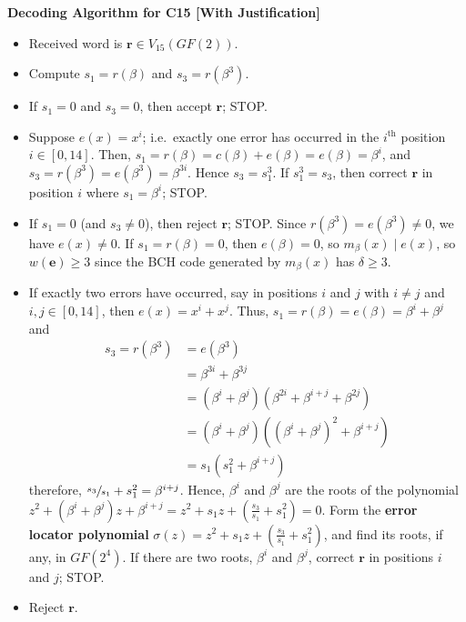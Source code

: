 \begin{algbox}
    \textbf{Decoding Algorithm for C15 [With Justification]}
    \begin{itemize}
        \item Received word is $ \bm{r}\in V_{15}(GF(2)) $.
        \item Compute $ s_1=r(\beta) $ and $ s_3=r(\beta^3) $.
        \item If $ s_1=0 $ and $ s_3=0 $, then accept $ \bm{r} $; STOP\@.
        \item Suppose $ e(x)=x^i $; i.e.\ exactly one error has occurred in the $ i^{\text{th}} $
              position $ i\in[0,14] $. Then, $ s_1=r(\beta)=c(\beta)+e(\beta)=e(\beta)=\beta^i $,
              and $ s_3=r(\beta^3)=e(\beta^3)=\beta^{3i} $. Hence $ s_3=s_1^3 $.
              If $ s_1^3=s_3 $, then correct $ \bm{r} $ in position $ i $ where $ s_1=\beta^i $;
              STOP\@.
        \item If $ s_1=0 $ (and $ s_3\neq 0 $), then reject $ \bm{r} $; STOP\@.
              Since $ r(\beta^3)=e(\beta^3)\neq 0 $, we have $ e(x)\neq 0 $. If $ s_1=r(\beta)=0 $,
              then $ e(\beta)=0 $, so $ m_{\beta}(x)\mid e(x) $, so $ w(\bm{e})\geqslant 3 $
              since the BCH code generated by $ m_{\beta}(x) $ has $ \delta\geqslant 3 $.
        \item If exactly two errors have occurred, say in positions $ i $ and $ j $ with
              $ i\neq j $ and $ i,j\in[0,14] $, then $ e(x)=x^i+x^j $. Thus, $ s_1=r(\beta)=
                  e(\beta)=\beta^i+\beta^j $ and
              \begin{align*}
                  s_3=r(\beta^3)
                   & =e(\beta^3)                                           \\
                   & =\beta^{3i}+\beta^{3j}                                \\
                   & =(\beta^i+\beta^j)(\beta^{2i}+\beta^{i+j}+\beta^{2j}) \\
                   & =(\beta^i+\beta^j)((\beta^i+\beta^j)^2+\beta^{i+j})   \\
                   & =s_1(s_1^2+\beta^{i+j})
              \end{align*}
              therefore, $ \sfrac{s_3}{s_1}+s_1^2=\beta^{i+j} $. Hence, $ \beta^i $
              and $ \beta^j $ are the roots of the polynomial $ z^2+(\beta^i+\beta^j)z+\beta^{i+j}=
                  z^2+s_1z+\left( \frac{s_3}{s_1} +s_1^2 \right)=0 $. Form the
              \textbf{error locator polynomial}
              $ \sigma(z)=z^2+s_1z+\left( \frac{s_3}{s_1} +s_1^2 \right) $, and find its
              roots, if any, in $ GF(2^4) $. If there are two roots, $ \beta^i $
              and $ \beta^j $, correct $ \bm{r} $ in positions $ i $ and $ j $; STOP\@.
        \item Reject $ \bm{r} $.
    \end{itemize}
\end{algbox}

